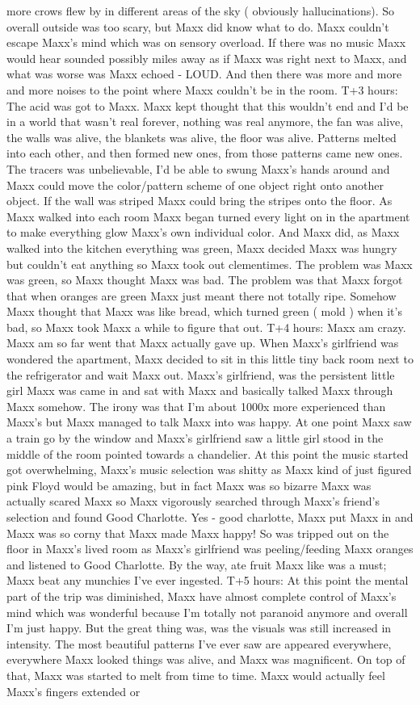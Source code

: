 \documentclass[12pt]{book}
\begin{document}
more crows flew by in different areas of the sky ( obviously hallucinations). So overall outside was too scary, but Maxx did know what to do. Maxx couldn't escape Maxx's mind which was on sensory overload. If there was no music Maxx would hear sounded possibly miles away as if Maxx was right next to Maxx, and what was worse was Maxx echoed - LOUD. And then there was more and more and more noises to the point where Maxx couldn't be in the room. T+3 hours: The acid was got to Maxx. Maxx kept thought that this wouldn't end and I'd be in a world that wasn't real forever, nothing was real anymore, the fan was alive, the walls was alive, the blankets was alive, the floor was alive. Patterns melted into each other, and then formed new ones, from those patterns came new ones. The tracers was unbelievable, I'd be able to swung Maxx's hands around and Maxx could move the color/pattern scheme of one object right onto another object. If the wall was striped Maxx could bring the stripes onto the floor. As Maxx walked into each room Maxx began turned every light on in the apartment to make everything glow Maxx's own individual color. And Maxx did, as Maxx walked into the kitchen everything was green, Maxx decided Maxx was hungry but couldn't eat anything so Maxx took out clementimes. The problem was Maxx was green, so Maxx thought Maxx was bad. The problem was that Maxx forgot that when oranges are green Maxx just meant there not totally ripe. Somehow Maxx thought that Maxx was like bread, which turned green ( mold ) when it's bad, so Maxx took Maxx a while to figure that out. T+4 hours: Maxx am crazy. Maxx am so far went that Maxx actually gave up. When Maxx's girlfriend was wondered the apartment, Maxx decided to sit in this little tiny back room next to the refrigerator and wait Maxx out. Maxx's girlfriend, was the persistent little girl Maxx was came in and sat with Maxx and basically talked Maxx through Maxx somehow. The irony was that I'm about 1000x more experienced than Maxx's but Maxx managed to talk Maxx into was happy. At one point Maxx saw a train go by the window and Maxx's girlfriend saw a little girl stood in the middle of the room pointed towards a chandelier. At this point the music started got overwhelming, Maxx's music selection was shitty as Maxx kind of just figured pink Floyd would be amazing, but in fact Maxx was so bizarre Maxx was actually scared Maxx so Maxx vigorously searched through Maxx's friend's selection and found Good Charlotte. Yes - good charlotte, Maxx put Maxx in and Maxx was so corny that Maxx made Maxx happy! So was tripped out on the floor in Maxx's lived room as Maxx's girlfriend was peeling/feeding Maxx oranges and listened to Good Charlotte. By the way, ate fruit Maxx like was a must; Maxx beat any munchies I've ever ingested. T+5 hours: At this point the mental part of the trip was diminished, Maxx have almost complete control of Maxx's mind which was wonderful because I'm totally not paranoid anymore and overall I'm just happy. But the great thing was, was the visuals was still increased in intensity. The most beautiful patterns I've ever saw are appeared everywhere, everywhere Maxx looked things was alive, and Maxx was magnificent. On top of that, Maxx was started to melt from time to time. Maxx would actually feel Maxx's fingers extended or 
\end{document}

